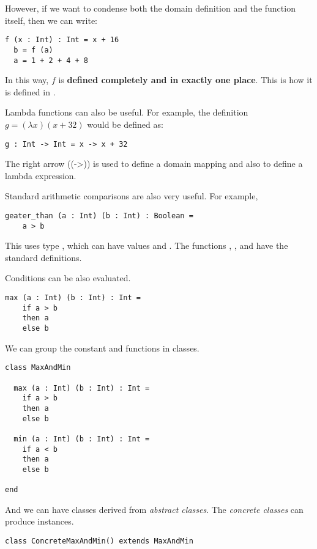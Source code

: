 However, if we want to condense both the domain definition and the function itself, then we can write:
\begin{lstlisting}[label={lst:exampleFunctionDefinition}]
  f (x : Int) : Int = x + 16
  b = f (a)
  a = 1 + 2 + 4 + 8
\end{lstlisting}

In this way, $f$ is \textbf{defined completely and in exactly one place}.
This is how it is defined in \Soda.

Lambda functions can also be useful.
For example, the definition
$g = (\lambda x)(x + 32)$
would be defined as:
\begin{lstlisting}[label={lst:exampleFunctionDefinitionWithLambda}]
  g : Int -> Int = x -> x + 32
\end{lstlisting}

The right arrow (\srccode(->)) is used to define a domain mapping and also to define a lambda expression.

Standard arithmetic comparisons are also very useful.
For example,
\begin{lstlisting}[label={lst:exampleComparison}]
  geater_than (a : Int) (b : Int) : Boolean =
    a > b
\end{lstlisting}

This uses type , which can have values \sodafalse and \sodatrue.
The functions \sodaand, \sodaor, and \sodanot have the standard definitions.

Conditions can be also evaluated.
\begin{lstlisting}[label={lst:exampleMax}]
  max (a : Int) (b : Int) : Int =
    if a > b
    then a
    else b
\end{lstlisting}

We can group the constant and functions in classes.

\begin{lstlisting}[label={lst:exampleClassMax}]
class MaxAndMin

  max (a : Int) (b : Int) : Int =
    if a > b
    then a
    else b

  min (a : Int) (b : Int) : Int =
    if a < b
    then a
    else b

end
\end{lstlisting}

And we can have classes derived from \emph{abstract classes}.
The \emph{concrete classes} can produce instances.

\begin{lstlisting}[label={lst:exampleClassMaxWithIndex}]
  class ConcreteMaxAndMin() extends MaxAndMin
\end{lstlisting}

